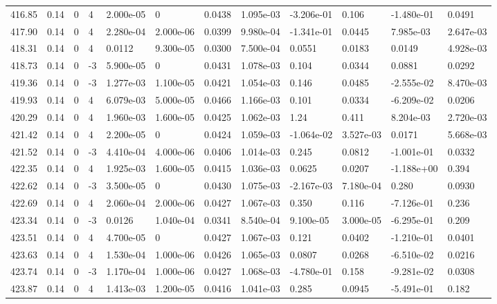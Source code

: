\documentclass[preview]{standalone}
\begin{document}
{{{{{{{{{{{{{{{{{{{\begin{tabular}{L{1.2cm}C{1.2cm} C{0.3cm}C{0.5cm} C{1.4cm}C{1.4cm} C{1.4cm}C{1.4cm} C{1.6cm}C{1.6cm} C{1.6cm}C{1.6cm}}
  416.85  &  0.14  & 0     &  4 &  2.000e-05  & 0  &  0.0438&   1.095e-03& -3.206e-01 & 0.106   &  -1.480e-01 & 0.0491  \\ 
  417.90  &  0.14  & 0     &  4 &  2.280e-04  & 2.000e-06  &  0.0399&   9.980e-04& -1.341e-01 & 0.0445   &  7.985e-03 & 2.647e-03  \\ 
  418.31  &  0.14  & 0     &  4 &  0.0112  & 9.300e-05  &  0.0300&   7.500e-04& 0.0551 & 0.0183   &  0.0149 & 4.928e-03  \\ 
  418.73  &  0.14  & 0     & -3 &  5.900e-05  & 0  &  0.0431&   1.078e-03& 0.104 & 0.0344   &  0.0881 & 0.0292  \\ 
  419.36  &  0.14  & 0     & -3 &  1.277e-03  & 1.100e-05  &  0.0421&   1.054e-03& 0.146 & 0.0485   &  -2.555e-02 & 8.470e-03  \\ 
  419.93  &  0.14  & 0     &  4 &  6.079e-03  & 5.000e-05  &  0.0466&   1.166e-03& 0.101 & 0.0334   &  -6.209e-02 & 0.0206  \\ 
  420.29  &  0.14  & 0     &  4 &  1.960e-03  & 1.600e-05  &  0.0425&   1.062e-03& 1.24 & 0.411   &  8.204e-03 & 2.720e-03  \\ 
  421.42  &  0.14  & 0     &  4 &  2.200e-05  & 0  &  0.0424&   1.059e-03& -1.064e-02 & 3.527e-03   &  0.0171 & 5.668e-03  \\ 
  421.52  &  0.14  & 0     & -3 &  4.410e-04  & 4.000e-06  &  0.0406&   1.014e-03& 0.245 & 0.0812   &  -1.001e-01 & 0.0332  \\ 
  422.35  &  0.14  & 0     &  4 &  1.925e-03  & 1.600e-05  &  0.0415&   1.036e-03& 0.0625 & 0.0207   &  -1.188e+00 & 0.394  \\ 
  422.62  &  0.14  & 0     & -3 &  3.500e-05  & 0  &  0.0430&   1.075e-03& -2.167e-03 & 7.180e-04   &  0.280 & 0.0930  \\ 
  422.69  &  0.14  & 0     &  4 &  2.060e-04  & 2.000e-06  &  0.0427&   1.067e-03& 0.350 & 0.116   &  -7.126e-01 & 0.236  \\ 
  423.34  &  0.14  & 0     & -3 &  0.0126  & 1.040e-04  &  0.0341&   8.540e-04& 9.100e-05 & 3.000e-05   &  -6.295e-01 & 0.209  \\ 
  423.51  &  0.14  & 0     &  4 &  4.700e-05  & 0  &  0.0427&   1.067e-03& 0.121 & 0.0402   &  -1.210e-01 & 0.0401  \\ 
  423.63  &  0.14  & 0     &  4 &  1.530e-04  & 1.000e-06  &  0.0426&   1.065e-03& 0.0807 & 0.0268   &  -6.510e-02 & 0.0216  \\ 
  423.74  &  0.14  & 0     & -3 &  1.170e-04  & 1.000e-06  &  0.0427&   1.068e-03& -4.780e-01 & 0.158   &  -9.281e-02 & 0.0308  \\ 
  423.87  &  0.14  & 0     &  4 &  1.413e-03  & 1.200e-05  &  0.0416&   1.041e-03& 0.285 & 0.0945   &  -5.491e-01 & 0.182  \\ 
\hline 
\end{tabular} 

}}}}}}}}}}}}}}}}}}}
\end{document}
